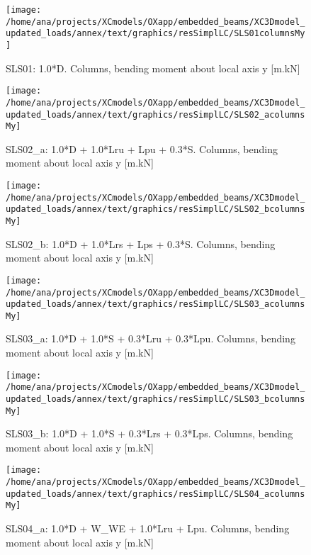 \begin{figure}
\begin{center}
\texttt{[image: /home/ana/projects/XCmodels/OXapp/embedded\_beams/XC3Dmodel\_updated\_loads/annex/text/graphics/resSimplLC/SLS01columnsMy]}
\caption{SLS01: 1.0*D. Columns, bending moment about local axis y [m.kN]}
\end{center}
\end{figure}

\begin{figure}
\begin{center}
\texttt{[image: /home/ana/projects/XCmodels/OXapp/embedded\_beams/XC3Dmodel\_updated\_loads/annex/text/graphics/resSimplLC/SLS02\_acolumnsMy]}
\caption{SLS02\_a: 1.0*D + 1.0*Lru + Lpu + 0.3*S. Columns, bending moment about local axis y [m.kN]}
\end{center}
\end{figure}

\begin{figure}
\begin{center}
\texttt{[image: /home/ana/projects/XCmodels/OXapp/embedded\_beams/XC3Dmodel\_updated\_loads/annex/text/graphics/resSimplLC/SLS02\_bcolumnsMy]}
\caption{SLS02\_b: 1.0*D + 1.0*Lrs + Lps + 0.3*S. Columns, bending moment about local axis y [m.kN]}
\end{center}
\end{figure}

\begin{figure}
\begin{center}
\texttt{[image: /home/ana/projects/XCmodels/OXapp/embedded\_beams/XC3Dmodel\_updated\_loads/annex/text/graphics/resSimplLC/SLS03\_acolumnsMy]}
\caption{SLS03\_a: 1.0*D + 1.0*S + 0.3*Lru + 0.3*Lpu. Columns, bending moment about local axis y [m.kN]}
\end{center}
\end{figure}

\begin{figure}
\begin{center}
\texttt{[image: /home/ana/projects/XCmodels/OXapp/embedded\_beams/XC3Dmodel\_updated\_loads/annex/text/graphics/resSimplLC/SLS03\_bcolumnsMy]}
\caption{SLS03\_b: 1.0*D + 1.0*S + 0.3*Lrs + 0.3*Lps. Columns, bending moment about local axis y [m.kN]}
\end{center}
\end{figure}

\begin{figure}
\begin{center}
\texttt{[image: /home/ana/projects/XCmodels/OXapp/embedded\_beams/XC3Dmodel\_updated\_loads/annex/text/graphics/resSimplLC/SLS04\_acolumnsMy]}
\caption{SLS04\_a: 1.0*D + W\_WE + 1.0*Lru + Lpu. Columns, bending moment about local axis y [m.kN]}
\end{center}
\end{figure}

